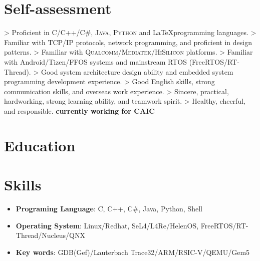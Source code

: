 \documentclass{resume}
\begin{document}
\section{Self-assessment}
> Proficient in \textsc{C}/\textsc{C++}/\textsc{C\#}, \textsc{Java}, \textsc{Python} and \LaTeX programming languages.										\newline
> Familiar with \textsc{TCP/IP} protocols, network programming, and proficient in design patterns.			\newline
> Familiar with \textsc{Qualcomm}/\textsc{Mediatek}/\textsc{HiSilicon} platforms.											\newline
> Familiar with Android/Tizen/FFOS systems and mainstream RTOS (FreeRTOS/RT-Thread).				\newline
> Good system architecture design ability and embedded system programming development experience.	\newline
> Good English skills, strong communication skills, and overseas work experience.				\newline
> Sincere, practical, hardworking, strong learning ability, and teamwork spirit.					\newline
> Healthy, cheerful, and responsible.															\newline
\textbf{currently working for CAIC}
\spaceline{}

\section{Education}


\spaceline{}

\section{Skills}
\begin{itemize}[parsep=0.2ex]
  \item \textbf{Programing Language}: C, C++, C\#, Java, Python, Shell
  \item \textbf{Operating System}: Linux/Redhat, SeL4/L4Re/HelenOS, FreeRTOS/RT-Thread/Nucleus/QNX
  \item \textbf{Key words}: GDB(Gef)/Lauterbach Trace32/ARM/RSIC-V/QEMU/Gem5
\end{itemize}
\end{document}
